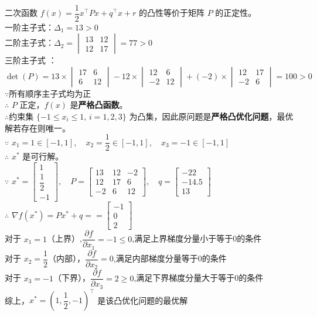 \documentclass{article}
\newenvironment{solution_cn}{%
  \begin{proof}[解答]%
  \kaishu  %
}{%
  \end{proof}%
}
\begin{document}
\begin{solution_cn}
\quad \\
二次函数 \( f(x) = \dfrac{1}{2} x^\top P x + q^\top x + r \) 的凸性等价于矩阵 \( P \) 的正定性。\\
一阶主子式：\( \Delta_1 = 13 > 0 \)\\
二阶主子式：$\Delta_2 = \begin{vmatrix} 13 & 12 \\ 12 & 17 \end{vmatrix} = 77 > 0$\\
三阶主子式 ：$\det(P) = 13 \times \begin{vmatrix} 17 & 6 \\ 6 & 12 \end{vmatrix} - 12 \times \begin{vmatrix} 12 & 6 \\ -2 & 12 \end{vmatrix} + (-2) \times \begin{vmatrix} 12 & 17 \\ -2 & 6 \end{vmatrix} = 100 > 0$\\
$\because$所有顺序主子式均为正\\$\therefore$ \( P \) 正定，\( f(x) \) 是\textbf{严格凸函数}。\\$\therefore$约束集 \( \{-1 \leq x_i \leq 1, \, i=1,2,3\} \) 为凸集，因此原问题是\textbf{严格凸优化问题}，最优解若存在则唯一。\\
$\because$ $x_1 = 1 \in [-1,1], \quad x_2 = \dfrac{1}{2} \in [-1,1], \quad x_3 = -1 \in [-1,1]$\\
$\therefore$ \( x^* \) 是可行解。  \\
$\because$
$
x^* = \begin{bmatrix} 1 \\ \dfrac{1}{2} \\ -1 \end{bmatrix}, \quad 
P = \begin{bmatrix} 13 & 12 & -2 \\ 12 & 17 & 6 \\ -2 & 6 & 12 \end{bmatrix}, \quad 
q = \begin{bmatrix} -22 \\ -14.5 \\ 13 \end{bmatrix}
$ \\
$\therefore$
$
\nabla f(x^*) = P x^* + q = = \begin{bmatrix} -1 \\ 0 \\ 2 \end{bmatrix}$\\
对于 \( x_1 = 1 \)（上界）,$\dfrac{\partial f}{\partial x_1} = -1 \leq 0$,满足上界梯度分量小于等于0的条件\\
对于 \( x_2 = \dfrac{1}{2} \)（内部），$\dfrac{\partial f}{\partial x_2} = 0$,满足内部梯度分量等于0的条件\\
对于 \( x_3 = -1 \)（下界），$\dfrac{\partial f}{\partial x_3} = 2 \geq 0$,满足下界梯度分量大于等于0的条件\\
综上，\( x^* = \left( 1, \dfrac{1}{2}, -1 \right)^\top \) 是该凸优化问题的最优解


\end{solution_cn}
\end{document}
